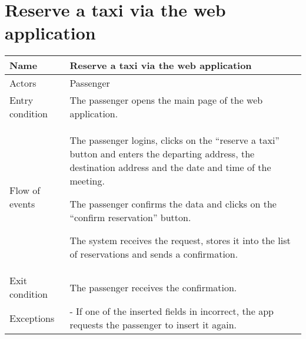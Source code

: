 \section{Reserve a taxi via the web application}
\begin{center}
\begin{longtable}{|l| p{9cm}|}
\hline
Name &
Reserve a taxi via the web application \\
\hline
Actors &
Passenger \\
\hline
Entry condition & 
The passenger opens the main page of the web application. \\
\hline
Flow of events & 
The passenger logins, clicks on the ``reserve a taxi'' button and enters the departing address, the destination address and the date and time of the meeting.

The passenger confirms the data and clicks on the ``confirm reservation'' button.

The system receives the request, stores it into the list of reservations and sends a confirmation. \\
\hline
Exit condition &
The passenger receives the confirmation. \\
\hline
Exceptions &
- If one of the inserted fields in incorrect, the app requests the passenger to insert it again. \\
\hline
\end{longtable}
\end{center}


